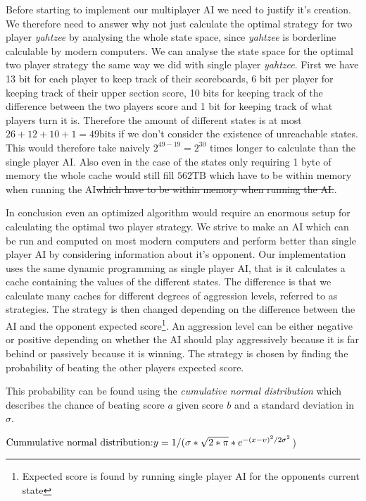 Before starting to implement our multiplayer AI we need to justify it's creation. We therefore need to answer why not just calculate the optimal strategy for two player \emph{yahtzee} by analysing the whole state space, since \emph{yahtzee} is borderline calculable by modern computers. We can analyse the state space for the optimal two player strategy the same way we did with single player \emph{yahtzee}. First we have 13 bit for each player to keep track of their scoreboards, 6 bit per player for keeping track of their upper section score, 10 bits for keeping track of the difference between the two players score and 1 bit for keeping track of what players turn it is. Therefore the amount of different states is at most $26+12+10+1 = 49\mbox{bits}$ if we don't consider the existence of unreachable states. This would therefore take naively $2^{49-19} = 2^{30}$ times longer to calculate than the single player AI. Also even in the case of the states only requiring 1 byte of memory the whole cache would still fill $562 \mbox{TB}$ which have to be within memory when running the AI\st{which have to be within memory when running the AI.}. 

In conclusion even an optimized algorithm would require an enormous setup for calculating the optimal two player strategy. We strive to make an AI which can be run and computed on most modern computers and perform better than single player AI by considering information about it's opponent. Our implementation uses the same dynamic programming as single player AI, that is it calculates a cache containing the values of the different states. The difference is that we calculate many caches for different degrees of aggression levels, referred to as strategies. The strategy is then changed depending on the difference between the AI and the opponent expected score\footnote{Expected score is found by running single player AI for the opponents current state}. An aggression level can be either negative or positive depending on whether the AI should play aggressively because it is far behind or passively because it is winning. The strategy is chosen by finding the probability of beating the other players expected score. 

This probability can be found using the \emph{cumulative normal distribution} which describes the chance of beating score $a$ given score $b$ and a standard deviation in  $\sigma$. %

$\newline\mbox{Cummulative normal distribution:} \newline y = 1  /(\sigma * \sqrt{2 * \pi} * e^{-(x - \upsilon)^2 / 2 \sigma^2}$)\newline

